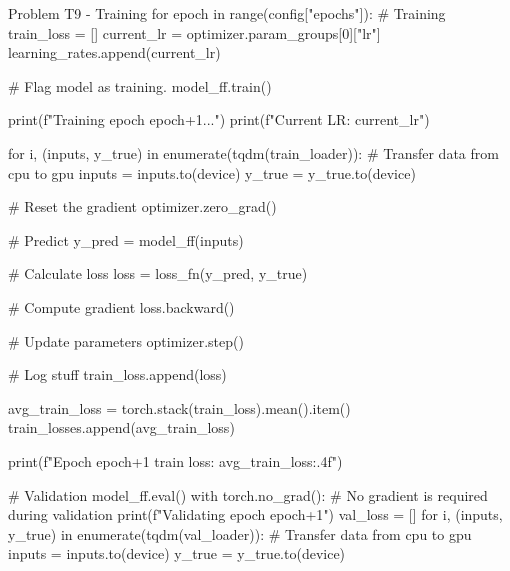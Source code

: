 \documentclass[12pt, a4paper]{article}
\begin{document}
                \begin{codeblock}{Problem T9 - Training}
                    for epoch in range(config["epochs"]):
                        # Training
                        train_loss = []
                        current_lr = optimizer.param_groups[0]["lr"]
                        learning_rates.append(current_lr)

                        # Flag model as training.
                        model_ff.train()

                        print(f"Training epoch {epoch+1}...")
                        print(f"Current LR: {current_lr}")

                        for i, (inputs, y_true) in enumerate(tqdm(train_loader)):
                            # Transfer data from cpu to gpu
                            inputs = inputs.to(device)
                            y_true = y_true.to(device)

                            # Reset the gradient
                            optimizer.zero_grad()

                            # Predict
                            y_pred = model_ff(inputs)

                            # Calculate loss
                            loss = loss_fn(y_pred, y_true)

                            # Compute gradient
                            loss.backward()

                            # Update parameters
                            optimizer.step()

                            # Log stuff
                            train_loss.append(loss)

                        avg_train_loss = torch.stack(train_loss).mean().item()
                        train_losses.append(avg_train_loss)

                        print(f"Epoch {epoch+1} train loss: {avg_train_loss:.4f}")

                        # Validation
                        model_ff.eval()
                        with torch.no_grad():  # No gradient is required during validation
                            print(f"Validating epoch {epoch+1}")
                            val_loss = []
                            for i, (inputs, y_true) in enumerate(tqdm(val_loader)):
                                # Transfer data from cpu to gpu
                                inputs = inputs.to(device)
                                y_true = y_true.to(device)


\end{codeblock}
\end{document}
